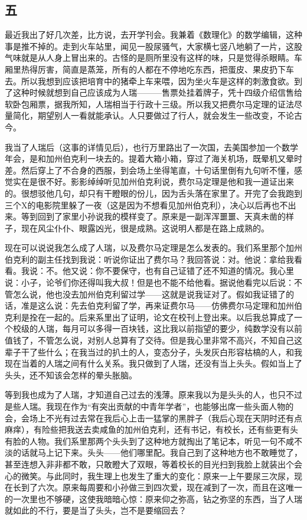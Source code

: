 \subsection{五} 

最近我出了好几次差，比方说，去开学刊会。我兼着《数理化》的数学编辑，这种事是推不掉的。走到火车站里，闻见一股尿骚气，大家横七竖八地躺了一片，这股气味就是从人身上冒出来的。古怪的是厕所里没有这样的味，只是觉得杀眼睛。车厢里热得厉害，简直是蒸笼，所有的人都在不停地吃东西，把蛋皮、果皮扔下车去。所以我想到应该把培育中的猪牵上车来喂，因为坐火车是这样的刺激食欲。到了这种时候就想到自己应该成为人瑞———售票处挂着牌子，凭十四级介绍信售给软卧包厢票，据我所知，人瑞相当于行政十三级。所以我又把费尔马定理的证法尽量简化，期望别人一看就能承认。人只要做过了行人，就会发生一些改变，不论古今。 

我当了人瑞后（这事的详情见后），也行万里路出了一次国，去美国参加一个数学年会，是和加州伯克利一块去的。提着大箱小箱，穿过了海关机场，既晕机又晕时差。然后穿上了不合身的西服，到会场上坐得笔直，十句话里倒有九句听不懂，感觉实在是很不好。影影绰绰听见加州伯克利说，费尔马定理是他和我一道证出来的。很想驳他几句，却只有干瞪眼的份儿，因为舌头落在家里了。开完了会我跑到三个X的电影院里躲了一夜（这是因为不想看见加州伯克利），决心以后再也不出来。等到回到了家里小孙说我的模样变了。原来是一副浑浑噩噩、天真未凿的样子，现在风尘仆仆、眼露凶光，很是成熟。这说明人都是在路上成熟的。 

现在可以说说我怎么成了人瑞，以及费尔马定理是怎么发表的。我们系里那个加州伯克利的副主任找到我说：听说你证出了费尔马？我回答说：对。他说：拿给我看看。我说：不。他又说：你不要保守，也有自己证错了还不知道的情况。我心里说：小子，论爷们你还得叫我大叔！但是也不能不给他看。据说他看完以后说：不管怎么说，他也没去加州伯克利留过学——这就是说我证对了。假如我证错了的话，准是这么说：先去伯克利留了学，再来证费尔马——仿佛费尔马定理和加州伯克利是拴在一起的。后来系里出了证明，论文在校刊上登出来。以后我总算成了一个校级的人瑞，每月可以多得一百块钱，这比我以前指望的要少，纯数学没有以前值钱了，不管怎么说，对别人总算有了交待。但是我心里非常不高兴，不知自己这辈子干了些什么；在我当过的扒土的人，变态分子，头发灰白形容枯槁的人，和我现在当着的人瑞之间有什么关系。我只做到了人瑞，还没有当上头头。假如当上了头头，还不知该会怎样的晕头胀脑。 

等到我也成为了人瑞，才知道自己过去的浅薄。原来我以为是头头的人，也只不过是些人瑞。我现在作为“有突出贡献的中青年学者”，也能够出席一些头面人物的会，会场上不光有过去常在我后心上击一猛掌的黑胖子（我后心现在天阴时还有点麻痒），有险些把我送去卖咸鱼的加州伯克利，还有书记，有校长，还有些更有头有脸的人物。我们系里那两个头头到了这种地方就掏出了笔记本，听见一句不咸不淡的话就马上记下来。头头——他们哪里配。我自己到了这种地方也不敢睡觉了，甚至连想入非非都不敢，只敢瞪大了双眼，等着校长的目光扫到我脸上就装出个会心的微笑。与此同时，我生理上也发生了重大的变化：原来一上午要尿三次尿，现在长到了六次。原来每周要和小孙做三到四次爱，现在减到了一次，而且在这唯一的一次里也不够硬，这使我暗暗心惊：原来仰之弥高，钻之弥坚的东西，当了人瑞就如此的不行，要是当了头头，岂不是要缩回去？ 

